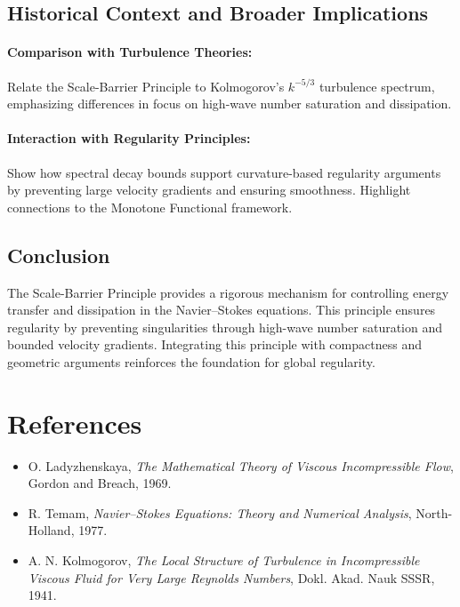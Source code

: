 \documentclass[12pt]{article}
\theoremstyle{definition}
\begin{document}
\subsection{Historical Context and Broader Implications}

\paragraph{Comparison with Turbulence Theories:}
Relate the Scale-Barrier Principle to Kolmogorov's $k^{-5/3}$ turbulence spectrum, emphasizing differences in focus on high-wave number saturation and dissipation.

\paragraph{Interaction with Regularity Principles:}
Show how spectral decay bounds support curvature-based regularity arguments by preventing large velocity gradients and ensuring smoothness. Highlight connections to the Monotone Functional framework.

\subsection{Conclusion}
The Scale-Barrier Principle provides a rigorous mechanism for controlling energy transfer and dissipation in the Navier--Stokes equations. This principle ensures regularity by preventing singularities through high-wave number saturation and bounded velocity gradients. Integrating this principle with compactness and geometric arguments reinforces the foundation for global regularity.

\section*{References}
\begin{itemize}
    \item O. Ladyzhenskaya, \emph{The Mathematical Theory of Viscous Incompressible Flow}, Gordon and Breach, 1969.
    \item R. Temam, \emph{Navier--Stokes Equations: Theory and Numerical Analysis}, North-Holland, 1977.
    \item A. N. Kolmogorov, \emph{The Local Structure of Turbulence in Incompressible Viscous Fluid for Very Large Reynolds Numbers}, Dokl. Akad. Nauk SSSR, 1941.
\end{itemize}
\end{document}
